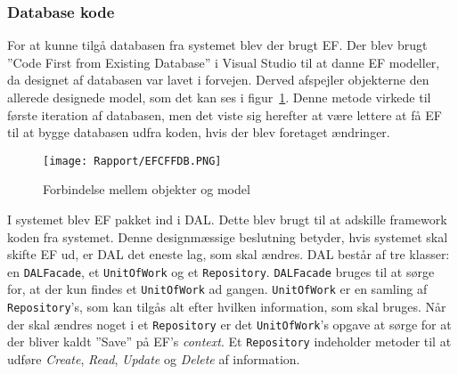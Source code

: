 \subsubsection{Database kode}
For at kunne tilgå databasen fra systemet blev der brugt \gls{EF}. 
Der blev brugt ''Code First from Existing Database'' i Visual Studio til at danne \gls{EF} modeller, da designet af databasen var lavet i forvejen. Derved afspejler objekterne den allerede designede model, som det kan ses i figur~\ref{fig:CodeFirstFromDB}. Denne metode virkede til første iteration af databasen, men det viste sig herefter at være lettere at få \gls{EF} til at bygge databasen udfra koden, hvis der blev foretaget ændringer.

\begin{figure}[H]
    \centering
	\texttt{[image: Rapport/EFCFFDB.PNG]}
	\caption{Forbindelse mellem objekter og model}
	\label{fig:CodeFirstFromDB}
\end{figure} 

I systemet blev \gls{EF} pakket ind i \gls{DAL}. Dette blev brugt til at adskille framework koden fra systemet. Denne designmæssige beslutning betyder, hvis systemet skal skifte \gls{EF} ud, er \gls{DAL} det eneste lag, som skal ændres.
\newline\newline
\gls{DAL} består af tre klasser: en \texttt{DALFacade}, et \texttt{UnitOfWork} og et \texttt{Repository}. 
\texttt{DALFacade} bruges til at sørge for, at der kun findes et \texttt{UnitOfWork} ad gangen.
\texttt{UnitOfWork} er en samling af \texttt{Repository}'s, som kan tilgås alt efter hvilken information, som skal bruges. Når der skal ændres noget i et \texttt{Repository} er det \texttt{UnitOfWork}'s opgave at sørge for at der bliver kaldt ''Save'' på \gls{EF}'s \textit{context}.
Et \texttt{Repository} indeholder metoder til at udføre \textit{Create}, \textit{Read}, \textit{Update} og \textit{Delete} af information.
